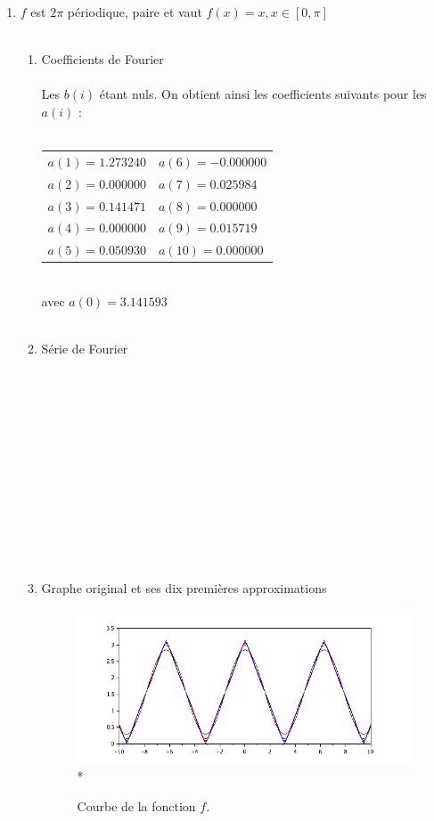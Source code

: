 \documentclass[a4paper,12pt]{report}
\begin{document}
\begin{enumerate}
		\item $f$ est $2\pi$ périodique, paire et vaut $f(x)=x, x \in [0,\pi]$ \\ \\
		\begin{enumerate}
			\item Coefficients de Fourier \\ \\
			Les $b(i)$ étant nuls. On obtient ainsi les coefficients suivants pour les $a(i)$ : \\ \\
			\begin{tabular}{l l}
				$a(1) = 1.273240$ & \hspace*{2cm}$a(6) = -0.000000$\\
				$a(2) = 0.000000$ & \hspace*{2cm}$a(7) = 0.025984$\\
				$a(3) = 0.141471$ & \hspace*{2cm}$a(8) = 0.000000$\\
				$a(4) = 0.000000$ & \hspace*{2cm}$a(9) = 0.015719$\\
				$a(5) = 0.050930$ & \hspace*{2cm}$a(10) = 0.000000$\\
			\end{tabular}\\
			avec $a(0) = 3.141593$\\ \\
			\item Série de Fourier \\ \\ \\ \\ \\ \\ \\ \\ \\ \\ \\ \\ \\

			\item Graphe original et ses dix premières approximations
			\begin{figure}[h!]
				\centering
				\includegraphics[scale=0.6]{ex1_fig3_1.png}\\*
				\caption{\label{ex1_figure3_1}Courbe de la fonction $f$.}
			\end{figure}\\
		

\end{enumerate}
\end{enumerate}
\end{document}
